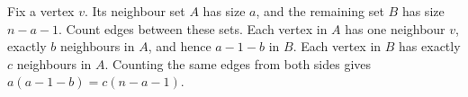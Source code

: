 Fix a vertex $ v $. Its neighbour set $ A $ has size $ a $, and the remaining set $ B $ has size $ n-a-1 $. Count edges between these sets. Each vertex in $ A $ has one neighbour $ v $, exactly $ b $ neighbours in $ A $, and hence $ a-1-b $ in $ B $. Each vertex in $ B $ has exactly $ c $ neighbours in $ A $. Counting the same edges from both sides gives $ a(a-1-b)=c(n-a-1)$.
